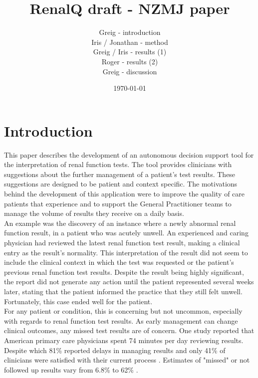 \documentclass[11pt]{article}
\title{\textbf{RenalQ draft - NZMJ paper}}
\author{Greig - introduction\\
		Iris / Jonathan - method\\
		Greig / Iris - results (1)\\
		Roger - results (2)\\
		Greig - discussion}
\date{\today}
\begin{document}
\maketitle


\section{Introduction}

This paper describes the development of an autonomous decision support tool for the interpretation of renal function tests. The tool provides clinicians with suggestions about the further management of a patient's test results. These suggestions are designed to be patient and context specific. The motivations behind the development of this application were to improve the quality of care patients that experience and to support the General Practitioner teams to manage the volume of results they receive on a daily basis. \\

An example was the discovery of an instance where a newly abnormal renal function result, in a patient who was acutely unwell. An experienced and caring physician had reviewed the latest renal function test result, making a clinical entry as the result's normality. This interpretation of the result did not seem to include the clinical context in which the test was requested or the patient's previous renal function test results. Despite the result being highly significant, the report did not generate any action until the patient represented several weeks later, stating that the patient informed the practice that they still felt unwell. Fortunately, this case ended well for the patient.\\ 

For any patient or condition, this is concerning but not uncommon, especially with regards to renal function test results.  As early management can change clinical outcomes, any missed test results are of concern. One study reported that American primary care physicians spent 74 minutes per day reviewing results. Despite which 81\% reported delays in managing results and only 41\% of clinicians were satisfied with their current process \citep{poon2004wish}. Estimates of "missed" or not followed up results vary from 6.8\% to 62\% \citep{callen2012failure}.\\
\end{document}
